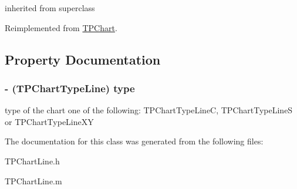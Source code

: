 inherited from superclass 

Reimplemented from \hyperlink{interface_t_p_chart_34d673557c84b693e02cd5fe587b9c6f}{TPChart}.

\subsection{Property Documentation}
\hypertarget{interface_t_p_chart_line_04e85b606d425d8329ea5f9b0ec0f50f}{
\subsubsection[{type}]{\setlength{\rightskip}{0pt plus 5cm}- (TPChartTypeLine) type}}
\label{interface_t_p_chart_line_04e85b606d425d8329ea5f9b0ec0f50f}


type of the chart one of the following: TPChartTypeLineC, TPChartTypeLineS or TPChartTypeLineXY 

The documentation for this class was generated from the following files:\begin{CompactItemize}
\item 
TPChartLine.h\item 
TPChartLine.m\end{CompactItemize}
